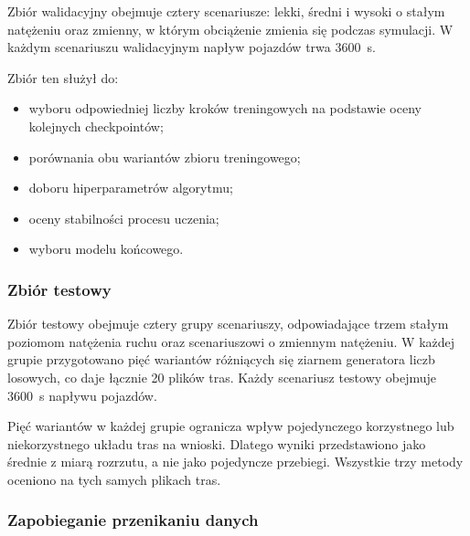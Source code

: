Zbiór walidacyjny obejmuje cztery scenariusze: lekki, średni i wysoki o stałym natężeniu oraz zmienny, w którym obciążenie zmienia się podczas symulacji. W każdym scenariuszu walidacyjnym napływ pojazdów trwa 3600~s.

Zbiór ten służył do:
\begin{itemize}
    \item wyboru odpowiedniej liczby kroków treningowych na podstawie oceny kolejnych checkpointów;
    \item porównania obu wariantów zbioru treningowego;
    \item doboru hiperparametrów algorytmu;
    \item oceny stabilności procesu uczenia;
    \item wyboru modelu końcowego.
\end{itemize}

\subsubsection{Zbiór testowy}
\label{subsubsec:zbior-testowy}

Zbiór testowy obejmuje cztery grupy scenariuszy, odpowiadające trzem stałym poziomom natężenia ruchu oraz scenariuszowi o zmiennym natężeniu. W każdej grupie przygotowano pięć wariantów różniących się ziarnem generatora liczb losowych, co daje łącznie 20 plików tras. Każdy scenariusz testowy obejmuje 3600~s napływu pojazdów.

Pięć wariantów w każdej grupie ogranicza wpływ pojedynczego korzystnego lub niekorzystnego układu tras na wnioski. Dlatego wyniki przedstawiono jako średnie z miarą rozrzutu, a nie jako pojedyncze przebiegi. Wszystkie trzy metody oceniono na tych samych plikach tras.

\subsubsection{Zapobieganie przenikaniu danych}
\label{subsubsec:przenikanie-danych}

